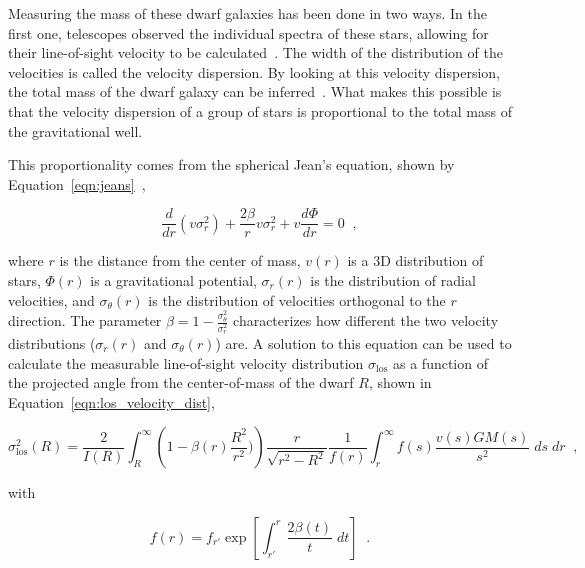Measuring the mass of these dwarf galaxies has been done in two ways.
In the first one, telescopes observed the individual spectra of these stars, allowing for their line-of-sight velocity to be calculated~\cite{dwarf_gal_red_giant}.
The width of the distribution of the velocities is called the velocity dispersion.
By looking at this velocity dispersion, the total mass of the dwarf galaxy can be inferred~\cite{dwarf_gal_vel_dispersion, dwarf_gal_vel_dispersion2}.
What makes this possible is that the velocity dispersion of a group of stars is proportional to the total mass of the gravitational well.

This proportionality comes from the spherical Jean's equation, shown by Equation~\ref{eqn:jeans}~\cite{galactic_dynamics},

\begin{equation}\label{eqn:jeans}
  \frac{d}{dr} \left ( v \sigma_r^2\right) + \frac{2 \beta}{r}v \sigma_r^2 + v \frac{d \Phi}{dr}=0 \;\; ,
\end{equation}

where $r$ is the distance from the center of mass, $v(r)$ is a 3D distribution of stars, $\Phi(r)$ is a gravitational potential, $\sigma_r(r)$ is the distribution of radial velocities, and $\sigma_\theta(r)$ is the distribution of velocities orthogonal to the $r$ direction.
The parameter $\beta = 1 - \frac{\sigma_{\theta}^2}{\sigma_r^2}$ characterizes how different the two velocity distributions ($\sigma_r(r)$ and $\sigma_{\theta}(r)$) are.
A solution to this equation can be used to calculate the measurable line-of-sight velocity distribution $\sigma_{\mathrm{los}}$ as a function of the projected angle from the center-of-mass of the dwarf $R$, shown in Equation~\ref{eqn:los_velocity_dist},

\begin{equation}\label{eqn:los_velocity_dist}
  \sigma_{\mathrm{los}}^2 \left ( R \right ) = \frac{2}{I(R)} \int_R^{\infty} \left ( 1 - \beta(r) \frac{R^2}{r^2}) \right ) \frac{r}{\sqrt{r^2-R^2}} \frac{1}{f(r)} \int_r^\infty f(s) \frac{v(s)GM(s)}{s^2} \; ds\; dr \;\; ,
\end{equation}

with

\begin{equation}\label{eqn:los_velocity_dist2}
  f(r) = f_{r'} \exp \left [ \int_{r'}^r \frac{2 \beta(t) }{t} \; dt \right ] \;\; .
\end{equation}

